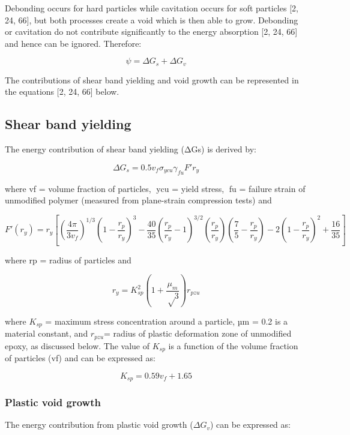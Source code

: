 \documentclass[numbers=noendperiod,chapterprefix=on]{icldt} %
\begin{document}
Debonding occurs for hard particles while cavitation occurs for soft particles [2, 24, 66], but both processes create a void which is then able to grow. Debonding or cavitation do not contribute significantly to the energy absorption [2, 24, 66] and hence can be ignored. Therefore:

\begin{equation} 
\psi=\Delta G_s+\Delta G_v
\end{equation}

The contributions of shear band yielding and void growth can be represented in the equations [2, 24, 66] below. 

\subsection{Shear band yielding}
The energy contribution of shear band yielding (ΔGs) is derived by: 

\begin{equation} 
\Delta G_s=0.5 v_f \sigma_{ycu} \gamma_{fu} F' r_y
\end{equation}

where vf = volume fraction of particles, ycu = yield stress, fu = failure strain of unmodified polymer (measured from plane-strain compression tests) and

\begin{equation} 
F'(r_y)=r_y \left[\left(\frac{4\pi}{3v_f}\right)^{1/3} \left( 1-\frac{r_p}{r_y} \right)^3-
\frac{40}{35} \left( \frac{r_p}{r_y}-1\right) ^{3/2}
(\frac{r_p}{r_y})\left(\frac{7}{5}-\frac{r_p}{r_y}\right) 
-2\left(1- \frac{r_p}{r_y}\right) ^2
+\frac{16}{35}\right]
\end{equation}

where rp = radius of particles and 

\begin{equation} 
r_y= K_{sp}^2 \left( 1+\frac{μ_m}{√3}\right)r_{pzu}
\end{equation}

where $K_{sp}$ = maximum stress concentration around a particle, µm = 0.2 is a material constant, and $r_{pzu}$= radius of plastic deformation zone of unmodified epoxy, as discussed below. The value of $K_{sp}$ is a function of the volume fraction of particles (vf) and can be expressed as:

\begin{equation} 
K_{sp}=0.59v_f+1.65
\end{equation}

\subsubsection{Plastic void growth}
The energy contribution from plastic void growth ($\Delta G_v$) can be expressed as:
\end{document}
